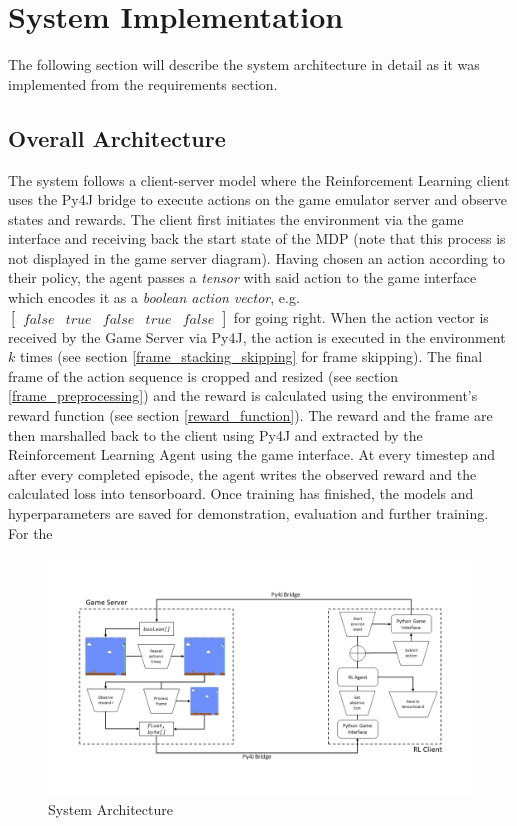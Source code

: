 \documentclass[notitlepage,a4paper,11pt]{article}
\begin{document}
	

\section{System Implementation}
The following section will describe the system architecture in detail as it was implemented from the requirements section.


\subsection{Overall Architecture}
The system follows a client-server model where the Reinforcement Learning client uses the Py4J bridge to execute actions on the game emulator server and observe states and rewards. The client first initiates the environment via the game interface and receiving back the start state of the MDP (note that this process is not displayed in the game server diagram). Having chosen an action according to their policy, the agent passes a \textit{tensor} with said action to the game interface which encodes it as a \textit{boolean action vector}, e.g. $\begin{bmatrix} false & true & false & true & false\end{bmatrix}$ for going right. When the action vector is received by the Game Server via Py4J, the action is executed in the environment $k$ times (see section \ref{frame_stacking_skipping} for frame skipping). The final frame of the action sequence is cropped and resized (see section \ref{frame_preprocessing}) and the reward is calculated using the environment's reward function (see section \ref{reward_function}). The reward and the frame are then marshalled back to the client using Py4J and extracted by the Reinforcement Learning Agent using the game interface. At every timestep and after every completed episode, the agent writes the observed reward and the calculated loss into tensorboard. Once training has finished, the models and hyperparameters are saved for demonstration, evaluation and further training. For the 

\begin{figure}[!htb]
\centering
\includegraphics[trim={0 2cm 0 2cm},clip,width=1\linewidth]{figs/system_architecture.png}
\caption{System Architecture}
\end{figure}
\end{document}
